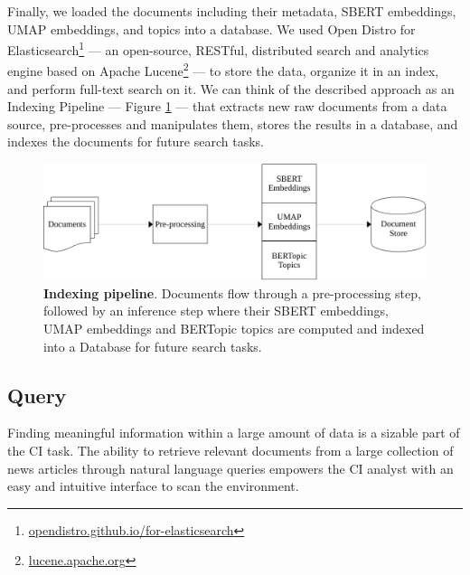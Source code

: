 \documentclass[a4paper]{article}
\begin{document}
Finally, we loaded the documents including their metadata, SBERT embeddings, UMAP embeddings, and topics into a database. We used Open Distro for Elasticsearch\footnote{\href{https://opendistro.github.io/for-elasticsearch/}{opendistro.github.io/for-elasticsearch}} — an open-source, RESTful, distributed search and analytics engine based on Apache Lucene\footnote{\href{https://lucene.apache.org/}{lucene.apache.org}} — to store the data, organize it in an index, and perform full-text search on it. We can think of the described approach as an Indexing Pipeline — Figure \ref{indexing_pipeline} — that extracts new raw documents from a data source, pre-processes and manipulates them, stores the results in a database, and indexes the documents for future search tasks.

\begin{figure}[H]
	\centering
	\includegraphics[scale=0.7]{./assets/indexing_pipeline}
	\caption{\textbf{Indexing pipeline}. Documents flow through a pre-processing step, followed by an inference step where their SBERT embeddings, UMAP embeddings and BERTopic topics are computed and indexed into a Database for future search tasks.}
	\label{indexing_pipeline}
\end{figure}

\subsection{Query} \label{query}
Finding meaningful information within a large amount of data is a sizable part of the CI task. The ability to retrieve relevant documents from a large collection of news articles through natural language queries empowers the CI analyst with an easy and intuitive interface to scan the environment.
\end{document}
